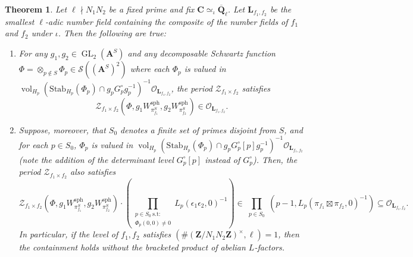 \documentclass{amsart}%
\theoremstyle{plain}
\newtheorem{thm}{Theorem}[subsection]
\theoremstyle{plain}
\theoremstyle{remark}
\DeclareMathOperator{\GL}{GL}
\DeclareMathOperator{\vol}{vol}
\begin{document}
\begin{thm}\label{thm global rankin selberg}
     Let $\ell\nmid N_1N_2$ be a fixed prime and fix $\mathbf{C}\simeq_\iota\overline{\mathbf{Q}}_\ell$. Let $\mathbf{L}_{f_1,f_2}$ be the smallest $\ell$-adic number field containing the composite of the number fields of $f_1$ and $f_2$ under $\iota$. Then the following are true: 
    \begin{enumerate}
        \item For any $g_1,g_2\in\GL_2(\mathbf{A}^S)$ and any decomposable Schwartz function $\Phi=\otimes_{p\not\in S}\Phi_p\in \mathcal{S}((\mathbf{A}^S)^2)$ where each $\Phi_p$ is valued in $\vol_{H_p}(\mathrm{Stab}_{H_p}(\Phi_p)\cap g_pG_p^\circ g_p^{-1})^{-1}\mathcal{O}_{\mathbf{L}_{f_1,f_2}}$, the period $\mathcal{Z}_{f_1\times f_2}$ satisfies $$\mathcal{Z}_{f_1\times f_2}(\Phi,g_1W_{\pi_{f_1}^S}^\mathrm{sph},g_2W_{\pi_{f_2}^S}^\mathrm{sph})\in\mathcal{O}_{\mathbf{L}_{f_1,f_2}}.$$ 
        \item Suppose, moreover, that $S_0$ denotes a finite set of primes disjoint from $S$, and for each $p\in S_0$, $\Phi_p$ is valued in $\vol_{H_p}(\mathrm{Stab}_{H_p}(\Phi_p)\cap g_pG_p^\circ[p]g_p^{-1})^{-1}\mathcal{O}_{\mathbf{L}_{f_1,f_2}}$ \emph{(note the addition of the determinant level $G_p^\circ[p]$ instead of $G_p^\circ$)}. Then, the period $\mathcal{Z}_{f_1\times f_2}$ also satisfies
        $$ \mathcal{Z}_{f_1\times f_2}(\Phi,g_1W_{\pi_{f_1}^S}^\mathrm{sph},g_2W_{\pi_{f_2}^S}^\mathrm{sph})\cdot \left(\prod_{\substack{p\in S_0\ \mathrm{s.t:}\\ \Phi_p(0,0)\neq 0}} L_p(\epsilon_1\epsilon_2,0)^{-1}\right)\in \prod_{\substack{p\in S_{0}}}\left(p-1,L_p(\pi_{f_1}\boxtimes \pi_{f_2},0)^{-1}\right)\subseteq\mathcal{O}_{\mathbf{L}_{f_1,f_2}}.$$
        In particular, if the level of $f_1,f_2$ satisfies $(\#(\mathbf{Z}/N_1 N_2\mathbf{Z})^\times,\ell)=1$, then the containment holds without the bracketed product of abelian $L$-factors.
    \end{enumerate}
    

\end{thm}
\end{document}
